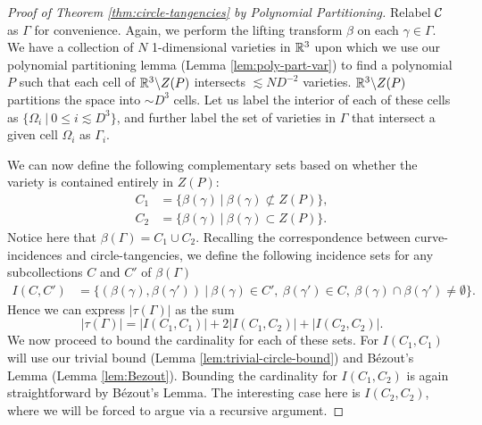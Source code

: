 \begin{proof}[Proof of Theorem \ref{thm:circle-tangencies} by Polynomial Partitioning]
Relabel $\mathcal C$ as $\Gamma$ for convenience. Again, we perform the lifting transform $\beta$ on each $\gamma \in \Gamma$. 
We have a collection of $N$ 1-dimensional varieties in $\mathbb R^3$ upon which we use our polynomial partitioning lemma (Lemma \ref{lem:poly-part-var})
to find a polynomial $P$ such that each cell of $\mathbb R^3 \backslash Z(P)$ intersects $\lesssim N D^{-2}$ varieties. 
$\mathbb R^3 \backslash Z(P)$ partitions the space into $\sim D^3$ cells. 
Let us label the interior of each of these cells as $\{\Omega_i \ | \ 0 \leq i \lesssim D^3 \}$, and further label the set of varieties in $\Gamma$ that intersect a given cell $\Omega_i$ as $\Gamma_i$.

We can now define the following complementary sets based on whether the variety is contained entirely in $Z(P)$:
\begin{align*}
    C_1 &= \{ \beta(\gamma) \ |\ \beta(\gamma) \not \subset Z(P) \},\\
    C_2 &= \{ \beta(\gamma) \ |\ \beta(\gamma)  \subset Z(P) \}.
\end{align*}
Notice here that $\beta(\Gamma) = C_1 \cup C_2$. Recalling the correspondence between curve-incidences and  circle-tangencies, we define the following
incidence sets for any subcollections $C$ and $C'$ of $\beta(\Gamma)$
\begin{align*}
    I(C, C') &= \{(\beta(\gamma), \beta(\gamma')) \ |  \ \beta(\gamma) \in C', \ \beta(\gamma') \in C, \ \beta(\gamma) \cap \beta(\gamma') \neq \emptyset \}.
\end{align*}
Hence we can express $|\tau(\Gamma)|$ as the sum
\[
    |\tau(\Gamma)| = |I(C_1, C_1)| + 2|I(C_1, C_2)| + |I(C_2, C_2)|.  
\]
We now proceed to bound the cardinality for each of these sets. For $I(C_1,C_1)$ will use our trivial bound (Lemma \ref{lem:trivial-circle-bound}) and Bézout's
Lemma (Lemma \ref{lem:Bezout}). Bounding the cardinality for $I(C_1,C_2)$ is again straightforward by Bézout's Lemma. 
The interesting case here is $I(C_2,C_2)$, where we will be forced to argue via a recursive argument.


\end{proof}
